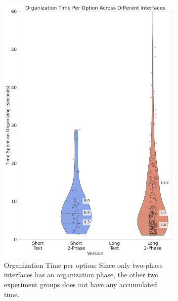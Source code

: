 \begin{figure}[htbp]
{\begin{minipage}{0.78\pdfpageheight}
            \begin{subfigure}[b]{0.25\pdfpageheight}
                \centering
                \includegraphics[width=\textwidth]{content/image/results/org_time_per_option.pdf}
                \captionsetup{width=0.87\textwidth}
                \caption{Organization Time per option: Since only two-phase interfaces has an organization phase, the other two experiment groups does not have any accumulated time.\vspace{25pt}}
                \label{fig:org_time}
            \end{subfigure}
            \begin{subfigure}[b]{0.25\pdfpageheight}
                \centering

\end{subfigure}
\end{minipage}}
\end{figure}
